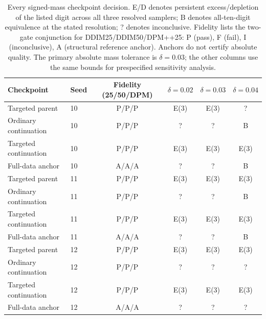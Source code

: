 \begin{table}[t]
\centering\small
\caption{Every signed-mass checkpoint decision. E/D denotes persistent excess/depletion of the listed digit across all three resolved samplers; B denotes all-ten-digit equivalence at the stated resolution; ? denotes inconclusive. Fidelity lists the two-gate conjunction for DDIM25/DDIM50/DPM++25: P (pass), F (fail), I (inconclusive), A (structural reference anchor). Anchors do not certify absolute quality. The primary absolute mass tolerance is $\delta=0.03$; the other columns use the same bounds for prespecified sensitivity analysis.}
\label{tab:mnist_balance_diagnosis}
\begin{tabular}{llcccc}
\toprule
Checkpoint & Seed & Fidelity (25/50/DPM) & $\delta=0.02$ & $\delta=0.03$ & $\delta=0.04$ \\
\midrule
Targeted parent & 10 & P/P/P & E(3) & E(3) & ? \\
Ordinary continuation & 10 & P/P/P & ? & ? & B \\
Targeted continuation & 10 & P/P/P & E(3) & E(3) & E(3) \\
Full-data anchor & 10 & A/A/A & ? & ? & B \\
Targeted parent & 11 & P/P/P & E(3) & E(3) & E(3) \\
Ordinary continuation & 11 & P/P/P & ? & ? & B \\
Targeted continuation & 11 & P/P/P & E(3) & E(3) & E(3) \\
Full-data anchor & 11 & A/A/A & ? & ? & B \\
Targeted parent & 12 & P/P/P & E(3) & E(3) & E(3) \\
Ordinary continuation & 12 & P/P/P & ? & ? & ? \\
Targeted continuation & 12 & P/P/P & E(3) & E(3) & E(3) \\
Full-data anchor & 12 & A/A/A & ? & ? & ? \\
\bottomrule
\end{tabular}
\end{table}
